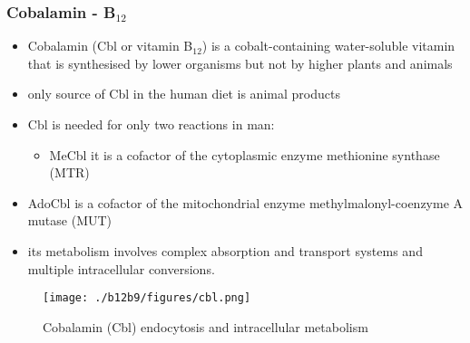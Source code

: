 \documentclass{scrartcl}
\begin{document}
\subsubsection{Cobalamin - B\(_{\text{12}}\)}
\label{sec:org2983c62}
\begin{itemize}
\item Cobalamin (Cbl or vitamin B\(_{\text{12}}\)) is a cobalt-containing
water-soluble vitamin that is synthesised by lower organisms but not
by higher plants and animals
\item only source of Cbl in the human diet is animal products
\item Cbl is needed for only two reactions in man:
\begin{itemize}
\item MeCbl it is a cofactor of the cytoplasmic enzyme methionine synthase (MTR)
\end{itemize}
\end{itemize}
\begin{itemize}
\item AdoCbl is a cofactor of the mitochondrial enzyme methylmalonyl-coenzyme A mutase (MUT)
\end{itemize}
\begin{itemize}
\item its metabolism involves complex absorption and transport systems and
multiple intracellular conversions.
\end{itemize}


\begin{figure}[htbp]
\centering
\texttt{[image: ./b12b9/figures/cbl.png]}
\caption{\label{fig:org47bf3bd}
Cobalamin (Cbl) endocytosis and intracellular metabolism}
\end{figure}
\end{document}
